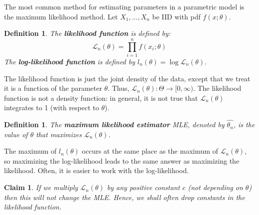 \documentclass[twoside]{article}
\newtheorem{claim}[theorem]{Claim}
\newtheorem{definition}[theorem]{Definition}
\begin{document}
The most common method for estimating parameters in a parametric model is the maximum likelihood method. Let $X_1,...,X_n$ be IID with pdf $f(x; \theta)$.
\begin{definition}
The \textbf{likelihood function} is defined by:
\begin{equation*}
    \mathcal{L}_n(\theta) = \prod\limits_{i = 1}^{n}f(x_i; \theta)
\end{equation*}
The \textbf{log-likelihood function} is defined by $l_n(\theta) = \log\mathcal{L}_n(\theta)$.
\end{definition}
The likelihood function is just the joint density of the data, except that we treat it is a function of the parameter $\theta$. Thus,  $\mathcal{L}_n(\theta) : \Theta \to [0, \infty)$. The likelihood function is not a density function: in general, it is not true that $\mathcal{L}_n(\theta)$ integrates to 1 (with respect to $\theta$).
\begin{definition}
The \textbf{maximum likelihood estimator} MLE, denoted by $\hat{\theta_n}$, is the value of $\theta$ that maximizes $\mathcal{L}_n(\theta)$.
\end{definition}
The maximum of $l_n(\theta)$ occurs at the same place as the maximum of $\mathcal{L}_n(\theta)$, so maximizing the log-likelihood leads to the same answer as maximizing the likelihood. Often, it is easier to work with the log-likelihood.
\begin{claim}
If we multiply $\mathcal{L}_n(\theta)$ by any positive constant $c$ (not depending on $\theta$) then this will not change the MLE. Hence, we shall often drop constants in the likelihood function.
\end{claim}
\end{document}
